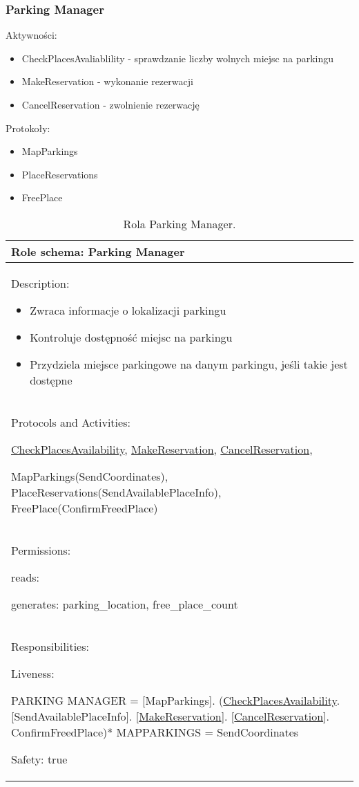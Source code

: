 \subsubsection{Parking Manager}

Aktywności:
\begin{itemize}
    \item CheckPlacesAvaliablility - sprawdzanie liczby wolnych miejsc na parkingu
    \item MakeReservation - wykonanie rezerwacji
    \item CancelReservation - zwolnienie rezerwację
\end{itemize}

Protokoły:
\begin{itemize}
    \item MapParkings
    \item PlaceReservations
    \item FreePlace
\end{itemize}


\begin{table}[!h] \label{tab:rola1} \centering
    \caption{Rola Parking Manager.}
    \begin{tabular} {| p{14cm} |} \hline
        Role schema: Parking Manager \\ \hline
        Description:

        \begin{itemize}
            \item Zwraca informacje o lokalizacji parkingu 
            \item Kontroluje dostępność miejsc na parkingu
            \item Przydziela miejsce parkingowe na danym parkingu, jeśli takie jest dostępne
            
        \end{itemize} \\ \hline
        Protocols and Activities: 
        
        \ul{CheckPlacesAvailability}, \ul{MakeReservation}, \ul{CancelReservation},

        MapParkings(SendCoordinates), PlaceReservations(SendAvailablePlaceInfo), FreePlace(ConfirmFreedPlace) \\ \hline
        Permissions:

        reads:

        generates:  parking\_location, free\_place\_count                                                                                        \\ \hline
        Responsibilities:

        Liveness:

        PARKING MANAGER = [MapParkings]. (\ul{CheckPlacesAvailability}. [SendAvailablePlaceInfo]. [\ul{MakeReservation}]. [\ul{CancelReservation}]. ConfirmFreedPlace)*
MAPPARKINGS = SendCoordinates

        Safety: true \\ \hline
    \end{tabular}
\end{table}

